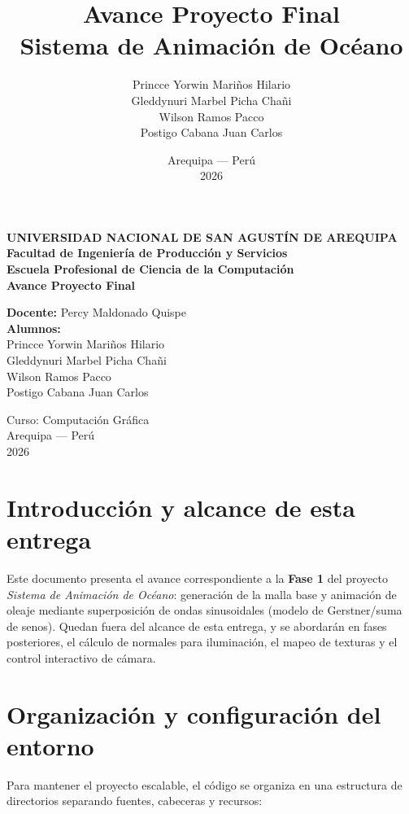 \documentclass[11pt]{article}
\title{Avance Proyecto Final \\ \large Sistema de Animación de Océano}
\author{
  Princce Yorwin Mariños Hilario \\
  Gleddynuri Marbel Picha Chañi \\
  Wilson Ramos Pacco \\
  Postigo Cabana Juan Carlos
}
\date{Arequipa --- Perú \\ 2026}
\begin{document}
\begin{titlepage}
\centering
\vspace*{1cm}
{\large\bfseries UNIVERSIDAD NACIONAL DE SAN AGUSTÍN DE AREQUIPA}\\[0.3cm]
{\bfseries Facultad de Ingeniería de Producción y Servicios}\\
{\bfseries Escuela Profesional de Ciencia de la Computación}\\[2cm]

\vspace{1cm}
{\Huge\bfseries Avance Proyecto Final}\\[1cm]

\vspace{2cm}
\begin{flushleft}
\textbf{Docente:} Percy Maldonado Quispe \\[0.5cm]
\textbf{Alumnos:} \\
Princce Yorwin Mariños Hilario \\
Gleddynuri Marbel Picha Chañi \\
Wilson Ramos Pacco \\
Postigo Cabana Juan Carlos
\end{flushleft}

\vfill
\centering
Curso: Computación Gráfica \\
Arequipa --- Perú \\
2026
\end{titlepage}

\tableofcontents
\newpage

\section{Introducción y alcance de esta entrega}

Este documento presenta el avance correspondiente a la \textbf{Fase 1} del proyecto
\emph{Sistema de Animación de Océano}: generación de la malla base y animación de
oleaje mediante superposición de ondas sinusoidales (modelo de Gerstner/suma de senos).
Quedan fuera del alcance de esta entrega, y se abordarán en fases posteriores, el
cálculo de normales para iluminación, el mapeo de texturas y el control interactivo
de cámara.

\section{Organización y configuración del entorno}

Para mantener el proyecto escalable, el código se organiza en una estructura de
directorios separando fuentes, cabeceras y recursos:
\end{document}
